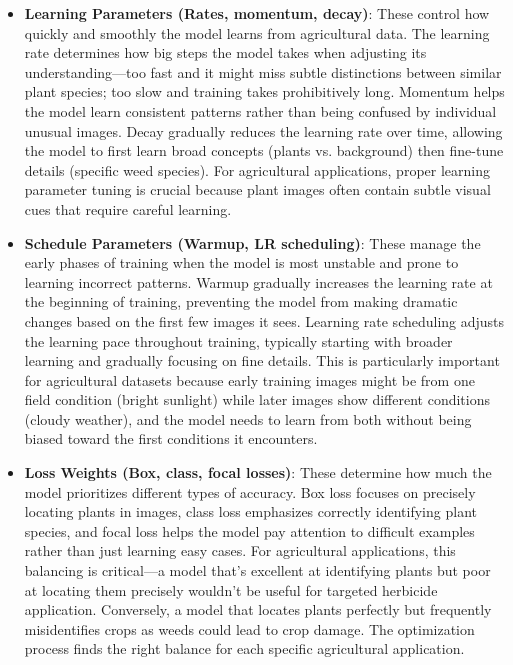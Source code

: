 \begin{itemize}
    \item \textbf{Learning Parameters (Rates, momentum, decay)}: These control how quickly and smoothly the model learns from agricultural data. The learning rate determines how big steps the model takes when adjusting its understanding—too fast and it might miss subtle distinctions between similar plant species; too slow and training takes prohibitively long. Momentum helps the model learn consistent patterns rather than being confused by individual unusual images. Decay gradually reduces the learning rate over time, allowing the model to first learn broad concepts (plants vs. background) then fine-tune details (specific weed species). For agricultural applications, proper learning parameter tuning is crucial because plant images often contain subtle visual cues that require careful learning.
    
    \item \textbf{Schedule Parameters (Warmup, LR scheduling)}: These manage the early phases of training when the model is most unstable and prone to learning incorrect patterns. Warmup gradually increases the learning rate at the beginning of training, preventing the model from making dramatic changes based on the first few images it sees. Learning rate scheduling adjusts the learning pace throughout training, typically starting with broader learning and gradually focusing on fine details. This is particularly important for agricultural datasets because early training images might be from one field condition (bright sunlight) while later images show different conditions (cloudy weather), and the model needs to learn from both without being biased toward the first conditions it encounters.
    
    \item \textbf{Loss Weights (Box, class, focal losses)}: These determine how much the model prioritizes different types of accuracy. Box loss focuses on precisely locating plants in images, class loss emphasizes correctly identifying plant species, and focal loss helps the model pay attention to difficult examples rather than just learning easy cases. For agricultural applications, this balancing is critical—a model that's excellent at identifying plants but poor at locating them precisely wouldn't be useful for targeted herbicide application. Conversely, a model that locates plants perfectly but frequently misidentifies crops as weeds could lead to crop damage. The optimization process finds the right balance for each specific agricultural application.
    

\end{itemize}
